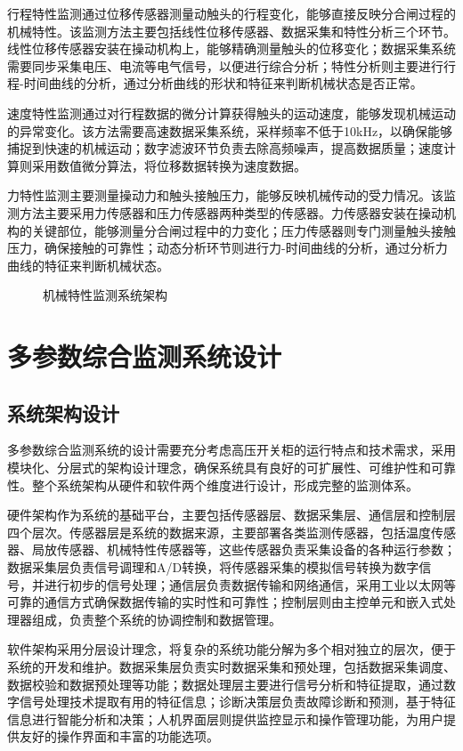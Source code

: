 行程特性监测通过位移传感器测量动触头的行程变化，能够直接反映分合闸过程的机械特性。该监测方法主要包括线性位移传感器、数据采集和特性分析三个环节。线性位移传感器安装在操动机构上，能够精确测量触头的位移变化；数据采集系统需要同步采集电压、电流等电气信号，以便进行综合分析；特性分析则主要进行行程-时间曲线的分析，通过分析曲线的形状和特征来判断机械状态是否正常。

速度特性监测通过对行程数据的微分计算获得触头的运动速度，能够发现机械运动的异常变化。该方法需要高速数据采集系统，采样频率不低于10kHz，以确保能够捕捉到快速的机械运动；数字滤波环节负责去除高频噪声，提高数据质量；速度计算则采用数值微分算法，将位移数据转换为速度数据。

力特性监测主要测量操动力和触头接触压力，能够反映机械传动的受力情况。该监测方法主要采用力传感器和压力传感器两种类型的传感器。力传感器安装在操动机构的关键部位，能够测量分合闸过程中的力变化；压力传感器则专门测量触头接触压力，确保接触的可靠性；动态分析环节则进行力-时间曲线的分析，通过分析力曲线的特征来判断机械状态。

\begin{figure}[h]
\centering
\caption{机械特性监测系统架构}
\label{fig:mechanical_monitoring}
\end{figure}

\section{多参数综合监测系统设计}

\subsection{系统架构设计}

多参数综合监测系统的设计需要充分考虑高压开关柜的运行特点和技术需求，采用模块化、分层式的架构设计理念，确保系统具有良好的可扩展性、可维护性和可靠性。整个系统架构从硬件和软件两个维度进行设计，形成完整的监测体系。

硬件架构作为系统的基础平台，主要包括传感器层、数据采集层、通信层和控制层四个层次。传感器层是系统的数据来源，主要部署各类监测传感器，包括温度传感器、局放传感器、机械特性传感器等，这些传感器负责采集设备的各种运行参数；数据采集层负责信号调理和A/D转换，将传感器采集的模拟信号转换为数字信号，并进行初步的信号处理；通信层负责数据传输和网络通信，采用工业以太网等可靠的通信方式确保数据传输的实时性和可靠性；控制层则由主控单元和嵌入式处理器组成，负责整个系统的协调控制和数据管理。

软件架构采用分层设计理念，将复杂的系统功能分解为多个相对独立的层次，便于系统的开发和维护。数据采集层负责实时数据采集和预处理，包括数据采集调度、数据校验和数据预处理等功能；数据处理层主要进行信号分析和特征提取，通过数字信号处理技术提取有用的特征信息；诊断决策层负责故障诊断和预测，基于特征信息进行智能分析和决策；人机界面层则提供监控显示和操作管理功能，为用户提供友好的操作界面和丰富的功能选项。

